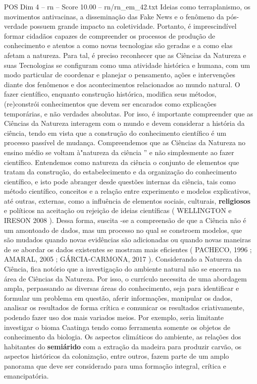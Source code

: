 \begin{textsample}{POS Dim 4 – rn – Score 10.00 – rn/rn\_em\_42.txt}
Ideias como terraplanismo, os movimentos antivacinas, a disseminação das Fake News e o fenômeno da pós-verdade possuem grande impacto na coletividade.
Portanto, é imprescindível formar cidadãos capazes de compreender os processos de produção de conhecimento e atentos a como novas tecnologias são geradas e a como elas afetam a natureza.
Para tal, é preciso reconhecer que as Ciências da Natureza e suas Tecnologias se configuram como uma atividade histórica e humana, com um modo particular de coordenar e planejar o pensamento, ações e intervenções diante dos fenômenos e dos acontecimentos relacionados ao mundo natural.
O fazer científico, enquanto construção histórica, modifica seus métodos, (re)constrói conhecimentos que devem ser encarados como explicações temporárias, e não verdades absolutas.
Por isso, é importante compreender que as Ciências da Natureza interagem com o mundo e devem considerar a história da ciência, tendo em vista que a construção do conhecimento científico é um processo passível de mudança.
Compreendemos que as Ciências da Natureza no ensino médio se voltam à"natureza da ciência ” e não simplesmente ao fazer científico.
Entendemos como natureza da ciência o conjunto de elementos que tratam da construção, do estabelecimento e da organização do conhecimento científico, e isto pode abranger desde questões internas da ciência, tais como método científico, conceitos e a relação entre experimento e modelos explicativos, até outras, externas, como a influência de elementos sociais, culturais, \textbf{religiosos} e políticos na aceitação ou rejeição de ideias científicas ( WELLINGTON e IRESON 2008 ).
Dessa forma, suscita -se a compreensão de que a Ciência não é um amontoado de dados, mas um processo no qual se constroem modelos, que são mudados quando novas evidências são adicionadas ou quando novas maneiras de se abordar os dados existentes se mostram mais eficientes ( PACHECO, 1996 ; AMARAL, 2005 ; GÁRCIA-CARMONA, 2017 ).
Considerando a Natureza da Ciência, fica notório que a investigação do ambiente natural não se encerra na área de Ciências da Natureza.
Por isso, o currículo necessita de uma abordagem ampla, perpassando as diversas áreas do conhecimento, seja para identificar e formular um problema em questão, aferir informações, manipular os dados, analisar os resultados de forma crítica e comunicar os resultados criativamente, podendo fazer uso dos mais variados meios.
Por exemplo, seria limitante investigar o bioma Caatinga tendo como ferramenta somente os objetos de conhecimento da biologia.
Os aspectos climáticos do ambiente, as relações dos habitantes do \textbf{semiárido} com a extração da madeira para produzir carvão, os aspectos históricos da colonização, entre outros, fazem parte de um amplo panorama que deve ser considerado para uma formação integral, crítica e emancipatória.

\end{textsample}
